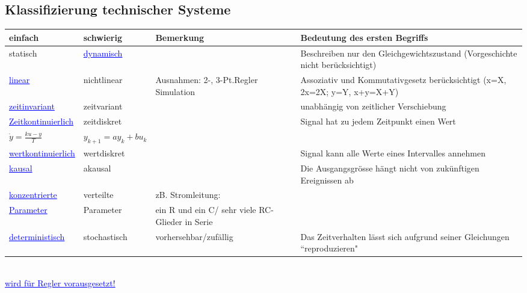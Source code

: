 		\subsection{Klassifizierung technischer Systeme}
		\begin{tabular}{|l|l|p{6cm}|p{6cm}|}
        	\hline
        	
        	einfach &
        	schwierig &
        	Bemerkung &
        	Bedeutung des \textbf{ersten} Begriffs\\
        	\hline
        	
        	statisch &
        	\textcolor{blue}{\underline{dynamisch}} &
        	&
        	Beschreiben nur den Gleichgewichtszustand (Vorgeschichte nicht
        	berücksichtigt)\\
        	\hline
        	
        	\textcolor{blue}{\underline{linear}}	&
        	nichtlinear &
        	Ausnahmen: 2-, 3-Pt.Regler Simulation &
        	Assoziativ und Kommutativgesetz berücksichtigt \newline (x=X, 2x=2X;
        	y=Y, x+y=X+Y)\\
        	\hline
        	
        	\textcolor{blue}{\underline{zeitinvariant}} &
        	zeitvariant &
        	&
        	unabhängig von zeitlicher Verschiebung \\
        	\hline
        	
        	\textcolor{blue}{\underline{Zeitkontinuierlich}} &
        	zeitdiskret &
        	&
        	Signal hat zu jedem Zeitpunkt einen Wert\\
        	$\dot{y}=\frac{ku-y}{T}$ &
        	$y_{k+1}=a y_k + b u_k$	&
        	&
        	\\
        	\hline
        	
        	\textcolor{blue}{\underline{wertkontinuierlich}}&
        	wertdiskret&
        	&
        	Signal kann alle Werte eines Intervalles annehmen\\
        	\hline
        	
        	\textcolor{blue}{\underline{kausal}}	&
        	akausal	&
        	&
        	Die Ausgangsgrösse hängt nicht von zukünftigen Ereignissen ab\\
        	\hline
        	
        	\textcolor{blue}{\underline{konzentrierte}} &
        	verteilte &
        	zB.	Stromleitung: &
        	\\
        	\textcolor{blue}{\underline{Parameter}} &
        	Parameter	&
        	ein R und ein C/ sehr viele RC-Glieder in Serie &
        	\\
        	\hline
        	
        	\textcolor{blue}{\underline{deterministisch}}	&
        	stochastisch &
        	vorhersehbar/zufällig &
        	Das Zeitverhalten lässt sich aufgrund seiner Gleichungen
        	``reproduzieren"\\
        	\hline
        \end{tabular}\\[1mm]
   				\textcolor{blue}{\underline{wird für Regler vorausgesetzt!}}
			
